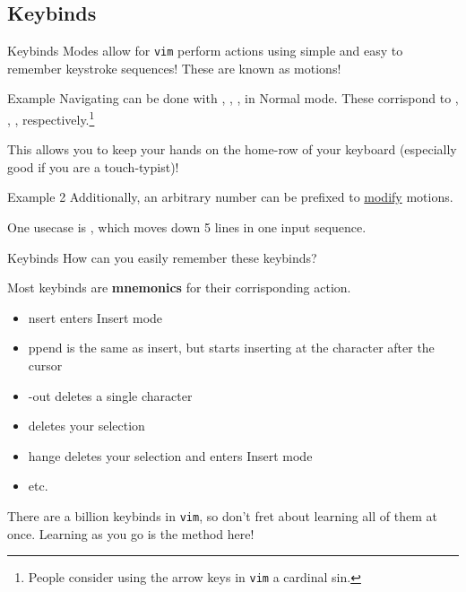\documentclass{beamer}
\begin{document}
\subsection{Keybinds}
\begin{frame}{Keybinds}
	Modes allow for \texttt{vim} perform actions using simple and easy to
	remember keystroke sequences! \pause These are known as motions!
	\pause

	\begin{exampleblock}{Example}
		Navigating can be done with , , ,
		 in Normal mode. These corrispond to \keys{\arrowkeyleft},
		\keys{\arrowkeydown}, \keys{\arrowkeyup}, \keys{\arrowkeyright}
		respectively.\footnote{People consider using the arrow keys in
		\texttt{vim} a cardinal sin.}
		\pause

		This allows you to keep your hands on the home-row of your
		keyboard (especially good if you are a touch-typist)!
	\end{exampleblock}
	\pause

	\begin{exampleblock}{Example 2}
		Additionally, an arbitrary number can be prefixed to
		\underline{modify} motions.
		\pause

		One usecase is , which moves down 5 lines in one
		input sequence.
	\end{exampleblock}
\end{frame}

\begin{frame}{Keybinds}
	How can you easily remember these keybinds?
	\pause

	Most keybinds are \textbf{mnemonics} for their corrisponding action.
	\begin{itemize}
		\item {}nsert enters Insert mode
		\item {}ppend is the same as insert, but starts
			inserting at the character after the cursor
		\item {}-out deletes a single character
		\item {} deletes your selection
		\item {}hange deletes your selection and enters Insert
			mode
		\item etc.
	\end{itemize}
	\pause

	There are a billion keybinds in \texttt{vim}, so don't fret about
	learning all of them at once. Learning as you go is the method here!
\end{frame}
\end{document}
